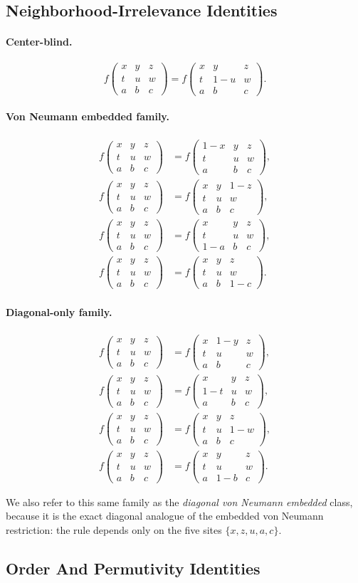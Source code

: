 \documentclass[11pt,a4paper]{article}
\newcommand{\nbhd}[9]{%
  \begin{smallmatrix}
  #1 & #2 & #3 \\
  #4 & #5 & #6 \\
  #7 & #8 & #9
  \end{smallmatrix}
}
\newcommand{\F}[1]{f\!\left(#1\right)}
\begin{document}
\subsection{Neighborhood-Irrelevance Identities}

\paragraph{Center-blind.}
\[
\F{\nbhd{x}{y}{z}{t}{u}{w}{a}{b}{c}}
=
\F{\nbhd{x}{y}{z}{t}{1-u}{w}{a}{b}{c}}.
\]

\paragraph{Von Neumann embedded family.}
\begin{align*}
\F{\nbhd{x}{y}{z}{t}{u}{w}{a}{b}{c}}
&=
\F{\nbhd{1-x}{y}{z}{t}{u}{w}{a}{b}{c}},\\
\F{\nbhd{x}{y}{z}{t}{u}{w}{a}{b}{c}}
&=
\F{\nbhd{x}{y}{1-z}{t}{u}{w}{a}{b}{c}},\\
\F{\nbhd{x}{y}{z}{t}{u}{w}{a}{b}{c}}
&=
\F{\nbhd{x}{y}{z}{t}{u}{w}{1-a}{b}{c}},\\
\F{\nbhd{x}{y}{z}{t}{u}{w}{a}{b}{c}}
&=
\F{\nbhd{x}{y}{z}{t}{u}{w}{a}{b}{1-c}}.
\end{align*}

\paragraph{Diagonal-only family.}
\begin{align*}
\F{\nbhd{x}{y}{z}{t}{u}{w}{a}{b}{c}}
&=
\F{\nbhd{x}{1-y}{z}{t}{u}{w}{a}{b}{c}},\\
\F{\nbhd{x}{y}{z}{t}{u}{w}{a}{b}{c}}
&=
\F{\nbhd{x}{y}{z}{1-t}{u}{w}{a}{b}{c}},\\
\F{\nbhd{x}{y}{z}{t}{u}{w}{a}{b}{c}}
&=
\F{\nbhd{x}{y}{z}{t}{u}{1-w}{a}{b}{c}},\\
\F{\nbhd{x}{y}{z}{t}{u}{w}{a}{b}{c}}
&=
\F{\nbhd{x}{y}{z}{t}{u}{w}{a}{1-b}{c}}.
\end{align*}

We also refer to this same family as the \emph{diagonal von Neumann embedded} class, because it
is the exact diagonal analogue of the embedded von Neumann restriction: the rule depends only on
the five sites \(\{x,z,u,a,c\}\).

\subsection{Order And Permutivity Identities}
\end{document}
